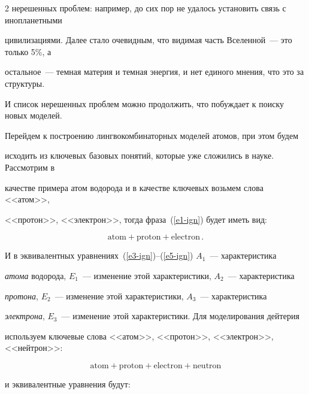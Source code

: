 \begin{multicols}{2}
нерешенных проблем: например, до сих пор не удалось установить связь с инопланетными 


цивилизациями. Далее стало очевидным, что видимая часть Вселенной~--- это только 5\%, а 


остальное~--- темная материя и темная энергия, и нет единого мнения, что это за структуры. 


И список нерешенных проб\-лем можно продолжить, что побуждает к поиску новых моделей.


      


      Перейдем к построению лингвокомбинаторных моделей атомов, при этом будем 


исходить из ключевых базовых понятий, которые уже сложились в науке. Рассмотрим в 


качестве примера атом водорода и в качестве ключевых возьмем слова <<атом>>, 


<<протон>>, <<электрон>>, тогда фраза~(\ref{e1-ign}) будет иметь вид:


      \begin{equation*}


      \mbox{atom} + \mbox{proton} + \mbox{electron}\,.




\end{equation*}


И в эквивалентных уравнениях~(\ref{e3-ign})--(\ref{e5-ign}) $A_1$~--- характеристика 


\textit{атома} водорода, $E_1$~--- изменение этой характеристики, $A_2$~--- характеристика 


\textit{протона}, $E_2$~--- изменение этой характеристики, $A_3$~--- характеристика 


\textit{электрона}, $E_3$~--- изменение этой характеристики. Для моделирования дейтерия 


используем ключевые слова <<атом>>, <<протон>>, <<электрон>>, <<нейтрон>>:


\begin{equation*}


\mbox{atom} + \mbox{proton} + \mbox{electron} + \mbox{neutron}




      \end{equation*}


и эквивалентные уравнения будут:


\begin{equation}



\end{equation}
\end{multicols}
